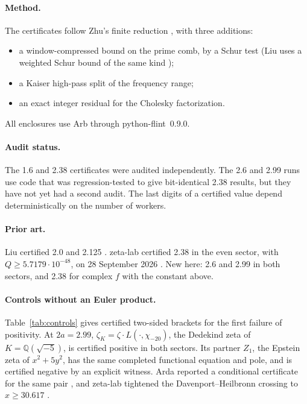 \documentclass[11pt]{article}
\theoremstyle{remark}
\begin{document}
\paragraph{Method.} The certificates follow Zhu's finite reduction \cite{zhu26}, with three additions:
\begin{itemize}
\item a window-compressed bound on the prime comb, by a Schur test (Liu uses a weighted Schur bound of the same kind \cite{liu26});
\item a Kaiser high-pass split of the frequency range;
\item an exact integer residual for the Cholesky factorization.
\end{itemize}
All enclosures use Arb through python-flint~0.9.0.

\paragraph{Audit status.} The 1.6 and 2.38 certificates were audited independently. The 2.6 and 2.99 runs use code that was regression-tested to give bit-identical 2.38 results, but they have not yet had a second audit. The last digits of a certified value depend deterministically on the number of workers.

\paragraph{Prior art.} Liu certified 2.0 and 2.125 \cite{liu26}. zeta-lab certified 2.38 in the even sector, with $Q\ge5.7179\cdot10^{-48}$, on 28 September 2026 \cite{zetalab258}. New here: 2.6 and 2.99 in both sectors, and 2.38 for complex $f$ with the constant above.

\paragraph{Controls without an Euler product.} Table~\ref{tab:controls} gives certified two-sided brackets for the first failure of positivity. At $2a=2.99$, $\zeta_K=\zeta\cdot L(\cdot,\chi_{-20})$, the Dedekind zeta of $K=\mathbb Q(\sqrt{-5})$, is certified positive in both sectors. Its partner $Z_1$, the Epstein zeta of $x^2+5y^2$, has the same completed functional equation and pole, and is certified negative by an explicit witness. Arda reported a conditional certificate for the same pair \cite{arda631}, and zeta-lab tightened the Davenport--Heilbronn crossing to $x\ge30.617$ \cite{zetalab253}.
\end{document}
